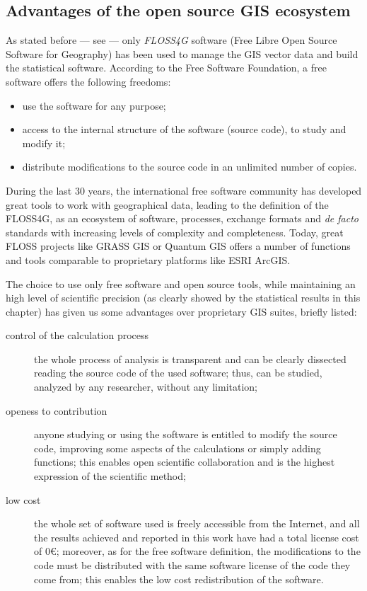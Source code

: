             \subsection{Advantages of the open source GIS ecosystem}
                As stated before --- see  --- only \emph{FLOSS4G} software (Free Libre Open Source Software for Geography) has been used to manage the GIS vector data and build the statistical software. According to the Free Software Foundation, %
                a free software offers the following freedoms:
                \begin{itemize}
                    \item use the software for any purpose;
                    \item access to the internal structure of the software (source code), to study and modify it;
                    \item distribute modifications to the source code in an unlimited number of copies.
                \end{itemize}
                During the last 30 years, the international free software community has developed great tools to work with geographical data, leading to the definition of the FLOSS4G, as an ecosystem of software, processes, exchange formats and \emph{de facto} standards with increasing levels of complexity and completeness. Today, great FLOSS projects like GRASS GIS or Quantum GIS offers a number of functions and tools comparable to proprietary platforms like ESRI ArcGIS.

                The choice to use only free software and open source tools, while maintaining an high level of scientific precision (as clearly showed by the statistical results in this chapter) has given us some advantages over proprietary GIS suites, briefly listed:
                \begin{description}
                    \item[control of the calculation process] the whole process of analysis is transparent and can be clearly dissected reading the source code of the used software; thus, can be studied, analyzed by any researcher, without any limitation;
                    \item[openess to contribution] anyone studying or using the software is entitled to modify the source code, improving some aspects of the calculations or simply adding functions; this enables open scientific collaboration and is the highest expression of the scientific method;
                    \item[low cost] the whole set of software used is freely accessible from the Internet, and all the results achieved and reported in this work have had a total license cost of $0\euro$; moreover, as for the free software definition, the modifications to the code must be distributed with the same software license of the code they come from; this enables the low cost redistribution of the software.
                \end{description}
